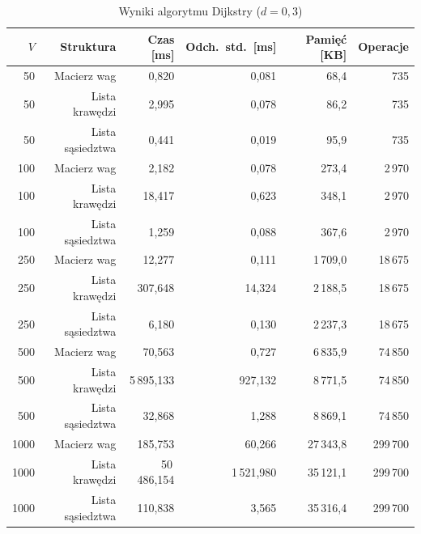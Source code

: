 \documentclass[12pt,a4paper]{article}
\begin{document}
\begin{table}[H]
\centering
\caption{Wyniki algorytmu Dijkstry ($d = 0{,}3$)}
\label{tab:results_dijkstra}
\small
\begin{tabular}{rrrrrr}
\toprule
$V$ & Struktura & Czas [ms] & Odch.\ std.\ [ms] & Pamięć [KB] & Operacje \\
\midrule
50  & Macierz wag      & 0{,}820  & 0{,}081 & 68{,}4   & 735 \\
50  & Lista krawędzi   & 2{,}995  & 0{,}078 & 86{,}2   & 735 \\
50  & Lista sąsiedztwa & 0{,}441  & 0{,}019 & 95{,}9   & 735 \\
\midrule
100 & Macierz wag      & 2{,}182  & 0{,}078 & 273{,}4  & 2\,970 \\
100 & Lista krawędzi   & 18{,}417 & 0{,}623 & 348{,}1  & 2\,970 \\
100 & Lista sąsiedztwa & 1{,}259  & 0{,}088 & 367{,}6  & 2\,970 \\
\midrule
250 & Macierz wag      & 12{,}277 & 0{,}111 & 1\,709{,}0 & 18\,675 \\
250 & Lista krawędzi   & 307{,}648 & 14{,}324 & 2\,188{,}5 & 18\,675 \\
250 & Lista sąsiedztwa & 6{,}180  & 0{,}130 & 2\,237{,}3 & 18\,675 \\
\midrule
500 & Macierz wag      & 70{,}563 & 0{,}727  & 6\,835{,}9  & 74\,850 \\
500 & Lista krawędzi   & 5\,895{,}133 & 927{,}132 & 8\,771{,}5 & 74\,850 \\
500 & Lista sąsiedztwa & 32{,}868 & 1{,}288  & 8\,869{,}1  & 74\,850 \\
\midrule
1000 & Macierz wag     & 185{,}753 & 60{,}266  & 27\,343{,}8 & 299\,700 \\
1000 & Lista krawędzi  & 50\,486{,}154 & 1\,521{,}980 & 35\,121{,}1 & 299\,700 \\
1000 & Lista sąsiedztwa & 110{,}838 & 3{,}565 & 35\,316{,}4 & 299\,700 \\
\bottomrule
\end{tabular}
\end{table}
\end{document}
